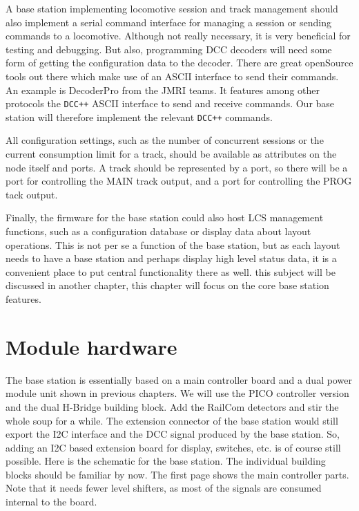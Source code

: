 A base station implementing locomotive session and track management should also implement a serial command interface for managing a session or sending commands to a locomotive. Although not really necessary, it is very beneficial for testing and debugging. But also, programming DCC decoders will need some form of getting the configuration data to the decoder. There are great openSource tools out there which make use of an ASCII interface to send their commands. An example is DecoderPro from the JMRI teams. It features among other protocols the \texttt{DCC++} ASCII interface to send and receive commands. Our base station will therefore implement the relevant \texttt{DCC++} commands.

All configuration settings, such as the number of concurrent sessions or the current consumption limit for a track, should be available as attributes on the node itself and ports. A track should be represented by a port, so there will be a port for controlling the MAIN track output, and a port for controlling the PROG tack output.

Finally, the firmware for the base station could also host LCS management functions, such as a configuration database or display data about layout operations. This is not per se a function of the base station, but as each layout needs to have a base station and perhaps display high level status data, it is a convenient place to put central functionality there as well. this subject will be discussed in another chapter, this chapter will focus on the core base station features.

\section{Module hardware}

The base station is essentially based on a main controller board and a dual power module unit shown in previous chapters. We will use the PICO controller version and the dual H-Bridge building block. Add the RailCom detectors and stir the whole soup for a while. The extension connector of the base station would still export the I2C interface and the DCC signal produced by the base station. So, adding an I2C based extension board for display, switches, etc. is of course still possible. Here is the schematic for the base station. The individual building blocks should be familiar by now. The first page shows the main controller parts. Note that it needs fewer level shifters, as most of the signals are consumed internal to the board.

